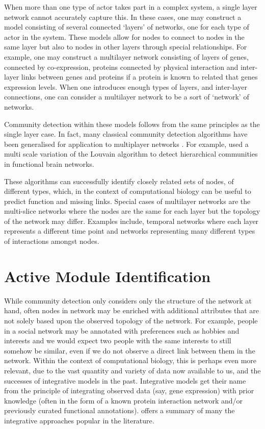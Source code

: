 \documentclass{report}
\begin{document}
	When more than one type of actor takes part in a complex system, a single layer network cannot accurately capture this. In these cases, one may construct a model consisting of several connected `layers' of networks, one for each type of actor in the system. These models allow for nodes to connect to nodes in the same layer but also to nodes in other layers through special relationships. For example, one may construct a multilayer network consisting of layers of genes, connected by co-expression, proteins connected by physical interaction and inter-layer links between genes and proteins if a protein is known to related that genes expression levels. When one introduces enough types of layers, and inter-layer connections, one can consider a multilayer network to be a sort of `network' of networks. 
	
	Community detection within these models follows from the same principles as the single layer case. In fact, many classical community detection algorithms have been generalised for application to multiplayer networks \cite{mucha2010community}. For example, \cite{ashourvan2017multi} used a multi scale variation of the Louvain algorithm to detect hierarchical communities in functional brain networks. 
	
	These algorithms can successfully identify closely related sets of nodes, of different types, which, in the context of computational biology can be useful to predict function and missing links. Special cases of multilayer networks are the multi-slice networks where the nodes are the same for each layer but the topology of the network may differ. Examples include, temporal networks where each layer represents a different time point and networks representing many different types of interactions amongst nodes. 
	
	\section{Active Module Identification}
	
	While community detection only considers only the structure of the network at hand, often nodes in network may be enriched with additional attributes that are not solely based upon the observed topology of the network. For example, people in a social network may be annotated with preferences such as hobbies and interests and we would expect two people with the same interests to still somehow be similar, even if we do not observe a direct link between them in the network. Within the context of computational biology, this is perhaps even more relevant, due to the vast quantity and variety of data now available to us, and the successes of integrative models in the past. Integrative models get their name from the principle of integrating observed data (say, gene expression) with prior knowledge (often in the form of a known protein interaction network and/or previously curated functional annotations). \cite{mitra2013integrative} offers a summary of many the integrative approaches popular in the literature.
	
\end{document}
